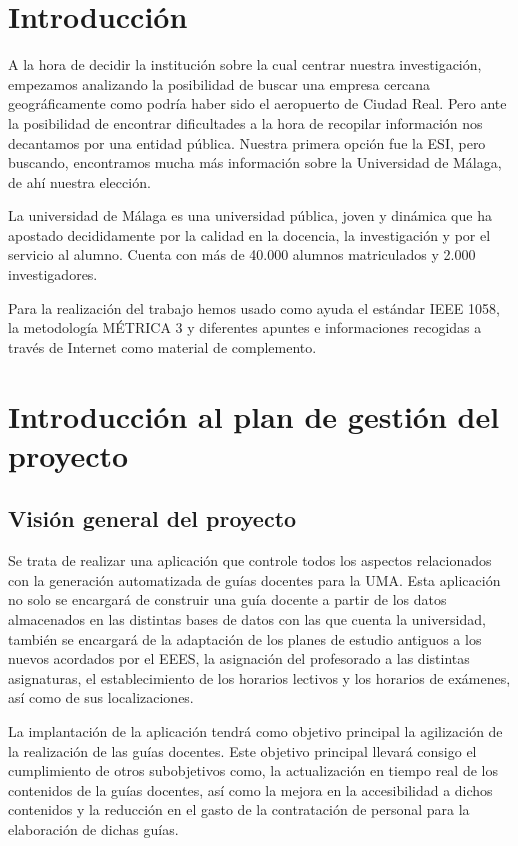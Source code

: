 \documentclass[11pt,a4paper,spanish,twoside]{report}
\begin{document}
\tableofcontents

\chapter*{Introducción}
A la hora de decidir la institución sobre la cual centrar nuestra 
investigación, empezamos analizando la posibilidad de buscar una empresa 
cercana geográficamente como podría haber sido el aeropuerto de Ciudad Real. 
Pero ante la posibilidad de encontrar dificultades a la hora de recopilar 
información nos decantamos por una entidad pública. Nuestra primera opción fue 
la ESI, pero buscando, encontramos mucha más información sobre la Universidad 
de Málaga, de ahí nuestra elección.

La universidad de Málaga es una universidad pública, joven y dinámica que ha 
apostado decididamente por la calidad en la docencia, la investigación y por el
servicio al alumno. Cuenta con más de 40.000 alumnos matriculados y 2.000 
investigadores. 

Para la realización del trabajo hemos usado como ayuda el estándar IEEE
1058\cite{ieee}, la metodología MÉTRICA 3\cite{met} y diferentes apuntes e
informaciones recogidas a través de Internet como material de complemento. 

\chapter{Introducción al plan de gestión del proyecto}
\section{Visión general del proyecto}
Se trata de realizar una aplicación que controle todos los aspectos 
relacionados con la generación automatizada de guías docentes para la UMA.
Esta aplicación no solo se encargará de construir una guía docente a partir de 
los datos almacenados en las distintas bases de datos con las que cuenta la 
universidad, también se encargará de la adaptación de los planes de estudio 
antiguos a los nuevos acordados por el EEES, la asignación del profesorado a 
las distintas asignaturas, el establecimiento de los horarios lectivos y los 
horarios de exámenes, así como de sus localizaciones.

La implantación de la aplicación tendrá como objetivo principal la agilización 
de la realización de las guías docentes. Este objetivo principal llevará 
consigo el cumplimiento de otros subobjetivos como, la actualización en tiempo 
real de los contenidos de la guías docentes, así como la mejora en la 
accesibilidad a dichos contenidos y la reducción en el gasto de la 
contratación de personal para la elaboración de dichas guías.
\end{document}
